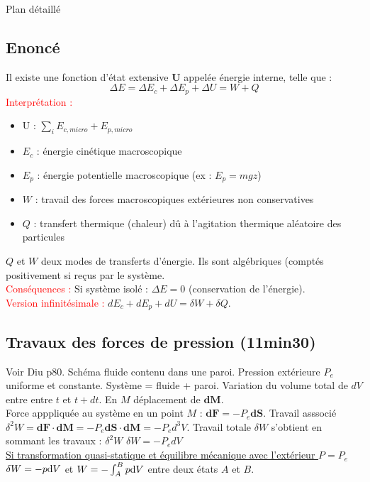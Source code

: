 \begin{reportBlock}{Plan détaillé}
  \subsection{Enoncé} Il existe une fonction d'état extensive \textbf{U} appelée énergie interne, telle que : 
  \begin{equation}
      \Delta E = \Delta E_c + \Delta E_p + \Delta U = W + Q
  \end{equation}
  \textcolor{red}{Interprétation :}
  \begin{itemize}
  \item U : $\sum_{i} E_{c,micro} + E_{p,micro}$
  \item $E_c$ : énergie cinétique macroscopique
  \item $E_p$ : énergie potentielle macroscopique (ex : $E_p=mgz$)
  \item $W$ : travail des forces macroscopiques extérieures non conservatives
  \item $Q$ : transfert thermique (chaleur) dû à l'agitation thermique aléatoire des particules
  \end{itemize}
  $Q$ et $W$ deux modes de transferts d'énergie. Ils sont algébriques (comptés positivement si reçus par le système. \\
  
  \textcolor{red}{Conséquences : } Si système isolé : $\Delta E = 0$ (conservation de l'énergie). \\
  
  \textcolor{red}{Version infinitésimale : } $dE_c + dE_p + dU = \delta W + \delta Q$.
  
  \subsection{Travaux des forces de pression (11min30)}
  Voir Diu p80. Schéma fluide contenu dans une paroi. Pression extérieure $P_e$ uniforme et constante. Système = {fluide + paroi}. Variation du volume total de $dV$ entre entre $t$ et $t+dt$. En $M$ déplacement de $\mathbf{dM}$. \\
  Force apppliquée au système en un point $M$ : $\mathbf{dF}=-P_e\mathbf{dS}$. Travail asssocié $\delta^2 W = \mathbf{dF}\cdot\mathbf{dM} = -P_e \mathbf{dS}\cdot\mathbf{dM} = - P_e d^3 V$. Travail totale $\delta W$ s'obtient en sommant les travaux : $\delta^2 W$ $\delta W = -P_e dV$\\
  
  \underline{Si transformation quasi-statique et équilibre mécanique avec l'extérieur $P=P_e$} $\delta W = - p \mathrm{d} V$ et $W = - \int_A^B p \mathrm{d} V$ entre deux états $A$ et $B$.
  

\end{reportBlock}
